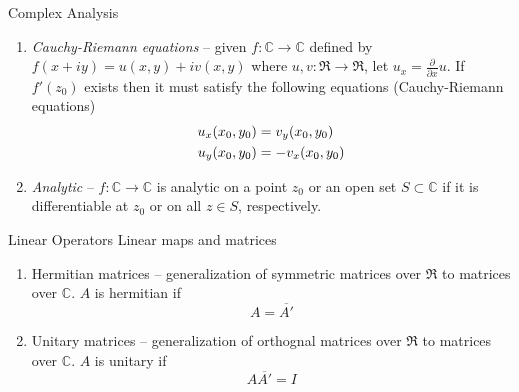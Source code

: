 \documentclass{article}
\begin{document}
\begin{section}{Complex Analysis}
\begin{enumerate}
\item \emph{Cauchy-Riemann equations} -- given $f : \mathbb{C} \to \mathbb{C}$
      defined by $f(x + iy) = u(x,y) + i v(x,y)$ where $u, v: \Re \to \Re$,
      let $u_x = \frac{\partial}{\partial x} u$. If $f'(z_0)$ exists then
      it must satisfy the following equations (Cauchy-Riemann equations)
      \begin{align}
      u_x(x_0, y_0) &= v_y(x_0, y_0) \notag \\
      u_y(x_0, y_0) &= - v_x(x_0, y_0) \notag
      \end{align}
\item \emph{Analytic} -- $f : \mathbb{C} \to \mathbb{C}$ is analytic on a
      point $z_0$ or an open set $S \subset \mathbb{C}$ if it is differentiable
      at $z_0$ or on all $z \in S$, respectively.

\end{enumerate}
\end{section}

\begin{section}{Linear Operators}
\noindent Linear maps and matrices

\begin{enumerate}
\item Hermitian matrices -- generalization of symmetric matrices over $\Re$ to
      matrices over $\mathbb{C}$. $A$ is hermitian if 
\[ A = \overline{A'} \]
\item Unitary matrices -- generalization of orthognal matrices over $\Re$ to
      matrices over $\mathbb{C}$. $A$ is unitary if
\[ A \overline{A'} = I \]
\end{enumerate}
\end{section}
\end{document}
